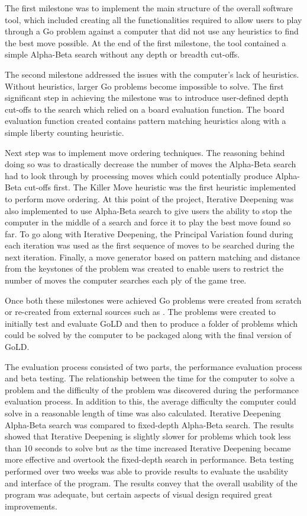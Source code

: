 \documentclass{l4proj}
\begin{document}
The first milestone was to implement the main structure of the overall software tool, which included creating all the functionalities required to allow users to play through a Go problem against a computer that did not use any heuristics to find the best move possible. At the end of the first milestone, the tool contained a simple Alpha-Beta search without any depth or breadth cut-offs.

The second milestone addressed the issues with the computer’s lack of heuristics. Without heuristics, larger Go problems become impossible to solve. The first significant step in achieving the milestone was to introduce user-defined depth cut-offs to the search which relied on a board evaluation function. The board evaluation function created contains pattern matching heuristics along with a simple liberty counting heuristic.

Next step was to implement move ordering techniques. The reasoning behind doing so was to drastically decrease the number of moves the Alpha-Beta search had to look through by processing moves which could potentially produce Alpha-Beta cut-offs first. The Killer Move heuristic was the first heuristic implemented to perform move ordering. At this point of the project, Iterative Deepening was also implemented to use Alpha-Beta search to give users the ability to stop the computer in the middle of a search and force it to play the best move found so far. To go along with Iterative Deepening, the Principal Variation found during each iteration was used as the first sequence of moves to be searched during the next iteration. Finally, a move generator based on pattern matching and distance from the keystones of the problem was created to enable users to restrict the number of moves the computer searches each ply of the game tree.






Once both these milestones were achieved Go problems were created from scratch or re-created from external sources such as \cite{Cho1993}\cite{Davies1975}\cite{GoProblems}. The problems were created to initially test and evaluate GoLD and then to produce a folder of problems which could be solved by the computer to be packaged along with the final version of GoLD.

The evaluation process consisted of two parts, the performance evaluation process and beta testing. The relationship between the time for the computer to solve a problem and the difficulty of the problem was discovered during the performance evaluation process. In addition to this, the average difficulty the computer could solve in a reasonable length of time was also calculated. Iterative Deepening Alpha-Beta search was compared to fixed-depth Alpha-Beta search. The results showed that Iterative Deepening is slightly slower for problems which took less than 10 seconds to solve but as the time increased Iterative Deepening became more effective and overtook the fixed-depth search in performance. Beta testing performed over two weeks was able to provide results to evaluate the usability and interface of the program. The results convey that the overall usability of the program was adequate, but certain aspects of visual design required great improvements.
\end{document}
